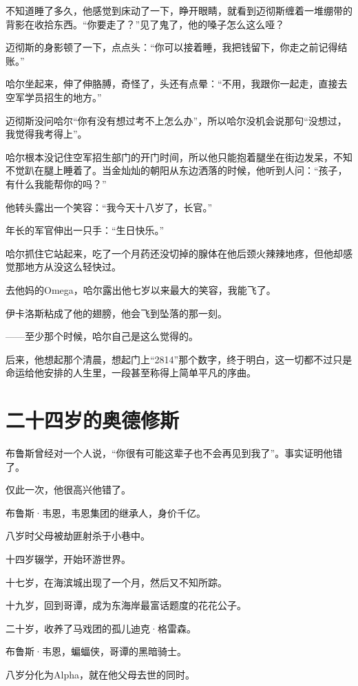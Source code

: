 \documentclass[../main]{subfiles}
\begin{document}
不知道睡了多久，他感觉到床动了一下，睁开眼睛，就看到迈彻斯缠着一堆绷带的背影在收拾东西。“你要走了？”见了鬼了，他的嗓子怎么这么哑？

迈彻斯的身影顿了一下，点点头：“你可以接着睡，我把钱留下，你走之前记得结账。”

哈尔坐起来，伸了伸胳膊，奇怪了，头还有点晕：“不用，我跟你一起走，直接去空军学员招生的地方。”

迈彻斯没问哈尔“你有没有想过考不上怎么办”，所以哈尔没机会说那句“没想过，我觉得我考得上”。

哈尔根本没记住空军招生部门的开门时间，所以他只能抱着腿坐在街边发呆，不知不觉趴在腿上睡着了。当金灿灿的朝阳从东边洒落的时候，他听到人问：“孩子，有什么我能帮你的吗？”

他转头露出一个笑容：“我今天十八岁了，长官。”

年长的军官伸出一只手：“生日快乐。”

哈尔抓住它站起来，吃了一个月药还没切掉的腺体在他后颈火辣辣地疼，但他却感觉那地方从没这么轻快过。

去他妈的Omega，哈尔露出他七岁以来最大的笑容，我能飞了。

伊卡洛斯粘成了他的翅膀，他会飞到坠落的那一刻。

——至少那个时候，哈尔自己是这么觉得的。

后来，他想起那个清晨，想起门上“2814”那个数字，终于明白，这一切都不过只是命运给他安排的人生里，一段甚至称得上简单平凡的序曲。

\theendnotes

\section{二十四岁的奥德修斯}

布鲁斯曾经对一个人说，“你很有可能这辈子也不会再见到我了”。事实证明他错了。

仅此一次，他很高兴他错了。

布鲁斯·韦恩，韦恩集团的继承人，身价千亿。

八岁时父母被劫匪射杀于小巷中。

十四岁辍学，开始环游世界。

十七岁，在海滨城出现了一个月，然后又不知所踪。

十九岁，回到哥谭，成为东海岸最富话题度的花花公子。

二十岁，收养了马戏团的孤儿迪克·格雷森。

布鲁斯·韦恩，蝙蝠侠，哥谭的黑暗骑士。

八岁分化为Alpha，就在他父母去世的同时。
\end{document}

